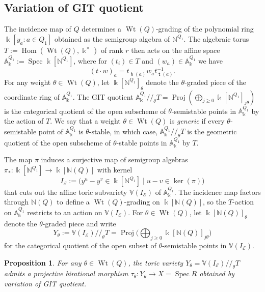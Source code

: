 \documentclass[11pt,a4paper]{amsart}
\numberwithin{equation}{section}
\newtheorem{proposition}[theorem]{Proposition}
\theoremstyle{definition}
\theoremstyle{remark}
\newcommand{\kk}{\ensuremath{\Bbbk}}
\newcommand{\NN}{\ensuremath{\mathbb{N}}}
\newcommand{\head}{\operatorname{\mathsf{h}}}
\newcommand{\git}{\ensuremath{/\!\!/\!}}
\newcommand{\tail}{\operatorname{\mathsf{t}}}
\newcommand{\Hom}{\operatorname{Hom}}
\newcommand{\Ker}{\operatorname{ker}}
\newcommand{\Proj}{\operatorname{Proj}}
\newcommand{\Spec}{\operatorname{Spec}}
\newcommand{\Wt}{\operatorname{Wt}}
\begin{document}
\subsection{Variation of GIT quotient}
The incidence map of $Q$ determines a $\Wt(Q)$-grading of the polynomial ring $\kk[y_a : a\in Q_1]$ obtained as the semigroup algebra of $\NN^{Q_1}$. The algebraic torus $T:=\Hom(\Wt(Q),\kk^\times)$ of rank $r$ then acts on the affine space $\mathbb{A}^{Q_1}_\kk:=\Spec \kk[\NN^{Q_1}]$, where for $(t_i)\in T$ and $(w_a)\in \mathbb{A}^{Q_1}_\kk$ we have
\begin{equation}\label{eqn:Taction}(t\cdot w)_{a} = t_{\head(a)}^{\,} w_{a} t_{\tail(a)}^{-1}.\end{equation} 
 For any weight $\theta \in \Wt(Q)$, let $\kk[\NN^{Q_1}]_{\theta}$ denote the $\theta$-graded piece of the coordinate ring of $\mathbb{A}^{Q_1}_\kk$. The GIT quotient $\mathbb{A}^{Q_1}_\kk\git_\theta T= \Proj(\bigoplus_{j\geq 0} \kk[\NN^{Q_1}]_{j\theta})$ is the categorical quotient of the open subscheme of  $\theta$-semistable points in $\mathbb{A}^{Q_1}_\kk$ by the action of $T$. We say that a weight $\theta\in \Wt(Q)$ is \emph{generic} if every $\theta$-semistable point of $\mathbb{A}^{Q_1}_\kk$ is $\theta$-stable, in which case, $\mathbb{A}^{Q_1}_\kk\git_\theta T$ is the geometric quotient of the open subscheme of  $\theta$-stable points in $\mathbb{A}^{Q_1}_\kk$ by $T$. 

The map $\pi$ induces a surjective map of semigroup algebras $\pi_*\colon \kk[\NN^{Q_1}]\to \kk[\NN(Q)]$ with kernel 
 \begin{equation} 
 \label{eqn:IQ} 
 I_{\mathscr{E}} := \big(y^u-y^v \in \kk[\NN^{Q_1}] \mid u-v\in \Ker(\pi)\big)
 \end{equation}
that cuts out the affine toric subvariety $\mathbb{V}(I_{\mathscr{E}})$ of $\mathbb{A}_\kk^{Q_1}$. The incidence map factors through $\NN(Q)$ to define a $\Wt(Q)$-grading on $\kk[\NN(Q)]$, so the $T$-action on $\mathbb{A}_\kk^{Q_1}$ restricts to an action on $\mathbb{V}(I_{\mathscr{E}})$. For $\theta \in \Wt(Q)$, let $\kk[\NN(Q)]_{\theta}$ denote the $\theta$-graded piece and write 
\[Y_\theta:= \mathbb{V}(I_{\mathscr{E}})\git_\theta T= \Proj\Big(\bigoplus_{j\geq 0} \kk[\NN(Q)]_{j\theta}\Big)\]
for the categorical quotient of the open subset of $\theta$-semistable points in $\mathbb{V}(I_{\mathscr{E}})$.

\begin{proposition}\label{prop:Ytheta}
For any $\theta\in \Wt(Q)$, the toric variety $Y_\theta = \mathbb{V}(I_{\mathscr{E}})\git_\theta T$ admits a projective birational morphism $\tau_\theta\colon Y_\theta \longrightarrow X=\Spec R$ obtained by variation of GIT quotient.\end{proposition}
\end{document}
